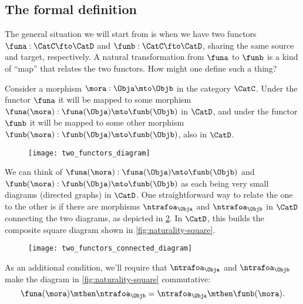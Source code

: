 
\subsection{The formal definition}

The general situation we will start from is when we have two functors $\funa : \CatC \fto \CatD$  and $\funb : \CatC \fto \CatD$, sharing the same source and target, respectively. A natural transformation from $\funa$ to $\funb$ is a kind of ``map'' that relates the two functors. How might one define such a thing? 

Consider a morphism $\mora : \Obja \mto \Objb$ in the category $\CatC$. Under the functor $\funa$ it will be mapped to some morphism $\funa(\mora): \funa(\Obja) \mto \funb(\Objb)$ in $\CatD$, and under the functor $\funb$ it will be mapped to some other morphism $\funb(\mora): \funb(\Obja) \mto \funb(\Objb)$, also in $\CatD$. 

%
\begin{figure}[h!]
    \texttt{[image: two\_functors\_diagram]}
    \caption{}
    \label{fig:two-functors-diagram}
\end{figure}
%



We can think of $\funa(\mora): \funa(\Obja) \mto \funb(\Objb)$ and $\funb(\mora): \funb(\Obja) \mto \funb(\Objb)$ as each being very small diagrams (directed graphs) in $\CatD$. One straightforward way to relate the one to the other is if there are morphisms $\ntrafoa_\Obja$ and $\ntrafoa_\Objb$ in $\CatD$ connecting the two diagrams, as depicted in \cref{fig:two-functors-connected-diagram}. In $\CatD$, this builds the composite square diagram shown in \cref{fig:naturality-square}. 

%
\begin{figure}[h!]
    \texttt{[image: two\_functors\_connected\_diagram]}
    \caption{}
    \label{fig:two-functors-connected-diagram}
\end{figure}
%


As an additional condition, we'll require that  $\ntrafoa_\Obja$ and $\ntrafoa_\Objb$ make the diagram in \cref{fig:naturality-square} commutative:
\begin{equation}
\funa(\mora) \mthen \ntrafoa_\Objb = \ntrafoa_\Obja \mthen \funb(\mora).
\end{equation}

